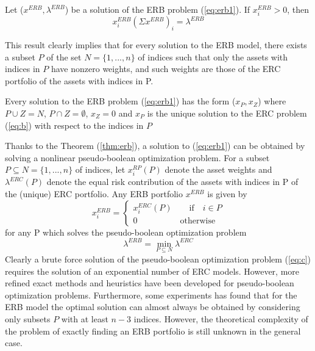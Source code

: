 \begin{lemma}
Let ($x^{ERB},\lambda^{ERB}$) be a solution of the ERB problem (\ref{eq:erb1}). If $x_i^{ERB}>0$, then
\begin{equation}
x_i^{ERB}(\Sigma x^{ERB})_i = \lambda^{ERB}
\end{equation}
\end{lemma}
This result clearly implies that for every solution to the ERB model, there exists a subset $P$ of the set $N = \{1,...,n\}$ of indices such that only the assets with indices in $P$ have nonzero weights, and such weights are those of the ERC portfolio of the assets with indices in P.
\begin{theorem}\label{thm:erb} 
Every solution to the ERB problem (\ref{eq:erb1}) has the form ($x_P,x_Z$) where $P \cup Z=N$, $P \cap  Z = \emptyset$, $x_Z=0$ and $x_P$ is the unique solution to the ERC problem (\ref{eq:b}) with respect to the indices in $P$
\end{theorem}
Thanks to the Theorem (\ref{thm:erb}), a solution to (\ref{eq:erb1}) can be obtained by solving a nonlinear pseudo-boolean optimization problem. For a subset $P\subseteq N = \{1,...,n\}$ of indices, let $x_i^{RP}(P)$ denote the asset weights and $\lambda^{ERC}(P)$ denote the equal risk contribution of the assets with indices in P of the (unique) ERC portfolio. Any ERB portfolio $x^{ERB}$ is given by
\begin{equation}
x_i^{ERB} = \begin{cases}
        x_i^{ERC}(P) \hspace{2em} \text{if}\hspace{1em} i \in P
        \\
        0 \hspace{5em} \text{otherwise}
        \end{cases}
\end{equation}
for any P which solves the pseudo-boolean optimization problem
\begin{equation}\label{eq:c}
\lambda^{ERB} = \min_{P\subseteq N} \lambda^{ERC}
\end{equation}
Clearly a brute force solution of the pseudo-boolean optimization problem (\ref{eq:c}) requires the solution of an exponential number of ERC models. However, more refined exact methods and heuristics have been developed for pseudo-boolean optimization problems. Furthermore, some experiments has found that for the ERB model the optimal solution can almost always be obtained by considering only subsets $P$ with at least $n-3$ indices. However, the theoretical complexity of the problem of exactly finding an ERB portfolio is still unknown in the general case.

